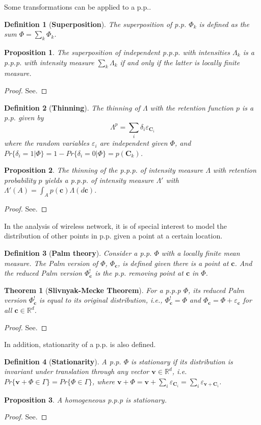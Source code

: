 \documentclass[a4paper,onecolumn,11pt]{IEEEtran}
\newtheorem{definition}{\textbf{Definition}}
\newtheorem{proposition}{\textbf{Proposition}}
\newtheorem{theorem}{\textbf{Theorem}}
\begin{document}
Some transformations can be applied to a p.p..
\begin{definition}[\textbf{Superposition}]
The superposition of p.p. $\Phi_k$ is defined as the sum $\Phi=\sum_k \Phi_k$. 	
\end{definition}
\begin{proposition}
The superposition of independent p.p.p. with intensities $\Lambda_k$ is a p.p.p. with intensity measure $\sum_k \Lambda_k$ if and only if the latter is locally finite measure.
\end{proposition}	
\begin{proof}
See.
\end{proof}
\begin{definition}[\textbf{Thinning}]
The thinning of $\Lambda$ with the retention function $p$ is a p.p. given by
\begin{displaymath}
\Lambda^p = \sum_i \delta_i \varepsilon_{\bm{C}_i} 
\end{displaymath}
where the random variables $\varepsilon_i$ are independent given $\Phi$, and $Pr\{\delta_i=1|\Phi\}=1-Pr\{\delta_i=0|\Phi\}=p(\bm{C}_k)$.
\end{definition}
\begin{proposition}
The thinning of the p.p.p. of intensity measure $\Lambda$ with retention probability $p$ yields a p.p.p. of intensity measure $\Lambda'$ with $\Lambda'(A)=\int_A p(\bm{c}) \Lambda(d\bm{c})$.
\end{proposition}
\begin{proof}
See.
\end{proof}
In the analysis of wireless network, it is of special interest to model the distribution of other points in p.p. given a point at a certain location.
\begin{definition}[\textbf{Palm theory}]
Consider a p.p. $\Phi$ with a locally finite mean measure. The Palm version of $\Phi$, $\Phi_{\bm{c}}$, is defined given there is a point at $\bm{c}$. And the reduced Palm version $\Phi_{\bm{c}}^!$ is the p.p. removing point at $\bm{c}$ in $\Phi$.  
\end{definition}
\begin{theorem}[\textbf{Slivnyak-Mecke Theorem}]
For a p.p.p $\Phi$, its reduced Palm version $\Phi_{\bm{c}}^!$ is equal to its original distribution, i.e., $\Phi_{\bm{c}}^! = \Phi$ and $\Phi_{\bm{c}} = \Phi+\varepsilon_{\bm{c}}$ for all $\bm{c}\in\mathbb{R}^d$.    
\end{theorem}
\begin{proof}
See.
\end{proof}
In addition, stationarity of a p.p. is also defined.
\begin{definition}[\textbf{Stationarity}]
A p.p. $\Phi$ is stationary if its distribution is invariant under translation through any vector $\bm{v}\in\mathbb{R}^d$, i.e. $Pr\{\bm{v}+\Phi \in \Gamma\}=Pr\{\Phi \in \Gamma\}$, where $\bm{v}+\Phi=\bm{v}+\sum_i \varepsilon_{\bm{C}_i} = \sum_i \varepsilon_{\bm{v}+\bm{C}_i}$.
\end{definition}
\begin{proposition}
A homogeneous p.p.p is stationary.
\end{proposition}
\begin{proof}
See.
\end{proof}
\end{document}

